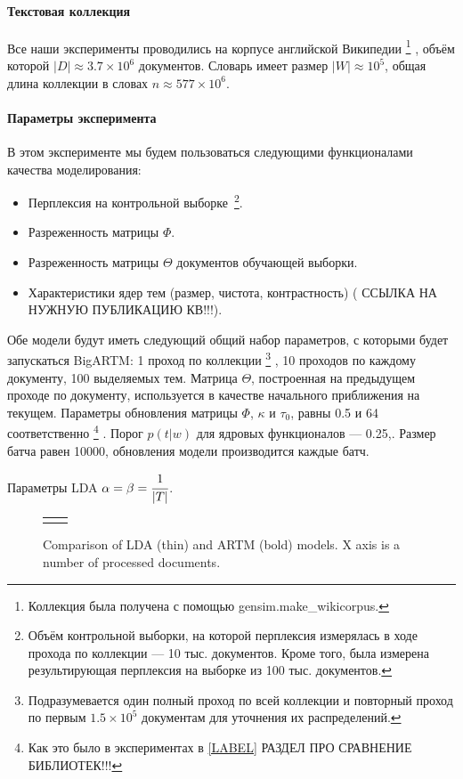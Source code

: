 \documentclass{article}
\begin{document}
\paragraph{Текстовая коллекция} Все наши эксперименты проводились на корпусе английской Википедии
\footnote{Коллекция была получена с помощью gensim.make\_wikicorpus.}
, объём которой $|D| \approx 3.7 \times 10^6$ документов. Словарь имеет размер $|W| \approx 10^5$, общая длина коллекции в словах $n \approx 577 \times 10^6$.

\paragraph{Параметры эксперимента}
В этом эксперименте мы будем пользоваться следующими функционалами качества моделирования:
\begin{itemize}
	\item Перплексия на контрольной выборке\
	\footnote{Объём контрольной выборки, на которой перплексия измерялась в ходе прохода по коллекции --- 10 тыс. документов. Кроме того, была измерена результирующая перплексия на выборке из 100 тыс. документов.}.
	\item Разреженность матрицы $\Phi$.
	\item Разреженность матрицы $\Theta$ документов обучающей выборки.
	\item Характеристики ядер тем (размер, чистота, контрастность) (\cite{LABEL} ССЫЛКА НА НУЖНУЮ ПУБЛИКАЦИЮ КВ!!!).
\end{itemize}
Обе модели будут иметь следующий общий набор параметров, с которыми будет запускаться BigARTM: 1 проход по коллекции
\footnote{Подразумевается один полный проход по всей коллекции и повторный проход по первым $1.5 \times 10^5$ документам для уточнения их распределений.}
, 10 проходов по каждому документу, 100 выделяемых тем. Матрица $\Theta$, построенная на предыдущем проходе по документу, используется в качестве начального приближения на текущем. Параметры обновления матрицы $\Phi$, $\kappa$ и $\tau_0$, равны 0.5 и 64 соответственно
\footnote{Как это было в экспериментах в \ref{LABEL} РАЗДЕЛ ПРО СРАВНЕНИЕ БИБЛИОТЕК!!!}
. Порог $p(t|w)$ для ядровых функционалов --- 0.25,. Размер батча равен 10000, обновления модели производится каждые батч.

Параметры LDA $\alpha = \beta = \cfrac{1}{|T|}$.

\begin{figure}[h!]
\begin{tabular}{cc}

&

\end{tabular}
\caption{Comparison of LDA (thin) and ARTM (bold) models. X axis is a number of processed documents.} \label{fig:comparison_plot}
\end{figure}
\end{document}
